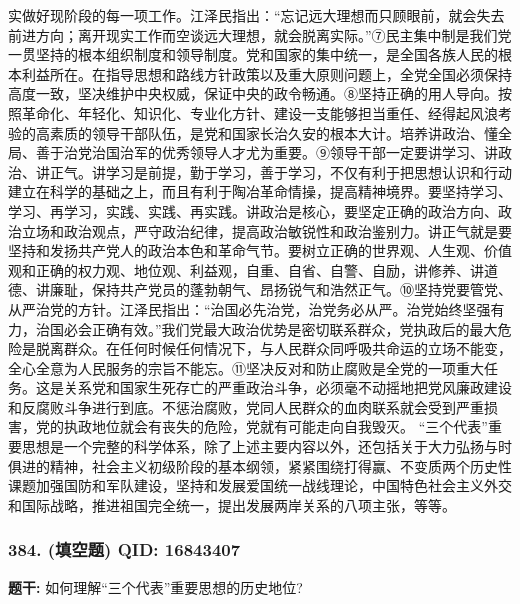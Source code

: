 \documentclass[12pt,UTF8]{ctexart}
\begin{document}
实做好现阶段的每一项工作。江泽民指出：“忘记远大理想而只顾眼前，就会失去前进方向；离开现实工作而空谈远大理想，就会脱离实际。”⑦民主集中制是我们党一贯坚持的根本组织制度和领导制度。党和国家的集中统一，是全国各族人民的根本利益所在。在指导思想和路线方针政策以及重大原则问题上，全党全国必须保持高度一致，坚决维护中央权威，保证中央的政令畅通。⑧坚持正确的用人导向。按照革命化、年轻化、知识化、专业化方针、建设一支能够担当重任、经得起风浪考验的高素质的领导干部队伍，是党和国家长治久安的根本大计。培养讲政治、懂全局、善于治党治国治军的优秀领导人才尤为重要。⑨领导干部一定要讲学习、讲政治、讲正气。讲学习是前提，勤于学习，善于学习，不仅有利于把思想认识和行动建立在科学的基础之上，而且有利于陶冶革命情操，提高精神境界。要坚持学习、学习、再学习，实践、实践、再实践。讲政治是核心，要坚定正确的政治方向、政治立场和政治观点，严守政治纪律，提高政治敏锐性和政治鉴别力。讲正气就是要坚持和发扬共产党人的政治本色和革命气节。要树立正确的世界观、人生观、价值观和正确的权力观、地位观、利益观，自重、自省、自警、自励，讲修养、讲道德、讲廉耻，保持共产党员的蓬勃朝气、昂扬锐气和浩然正气。⑩坚持党要管党、从严治党的方针。江泽民指出：“治国必先治党，治党务必从严。治党始终坚强有力，治国必会正确有效。”我们党最大政治优势是密切联系群众，党执政后的最大危险是脱离群众。在任何时候任何情况下，与人民群众同呼吸共命运的立场不能变，全心全意为人民服务的宗旨不能忘。⑪坚决反对和防止腐败是全党的一项重大任务。这是关系党和国家生死存亡的严重政治斗争，必须毫不动摇地把党风廉政建设和反腐败斗争进行到底。不惩治腐败，党同人民群众的血肉联系就会受到严重损害，党的执政地位就会有丧失的危险，党就有可能走向自我毁灭。
“三个代表”重要思想是一个完整的科学体系，除了上述主要内容以外，还包括关于大力弘扬与时俱进的精神，社会主义初级阶段的基本纲领，紧紧围绕打得赢、不变质两个历史性课题加强国防和军队建设，坚持和发展爱国统一战线理论，中国特色社会主义外交和国际战略，推进祖国完全统一，提出发展两岸关系的八项主张，等等。

\vspace{0.3em}\hrulefill\vspace{0.7em}

\subsubsection*{384. (填空题) \small QID: 16843407}

\textbf{题干:}
如何理解“三个代表”重要思想的历史地位?
\end{document}
